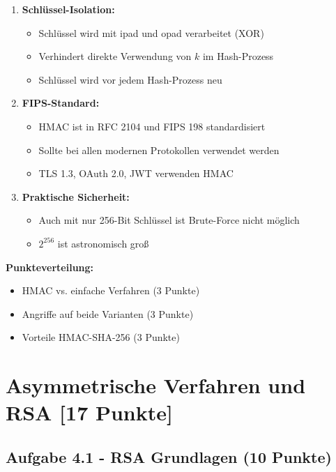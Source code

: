 \documentclass[12pt,a4paper]{article}
\begin{document}
\begin{tcolorbox}[colback=solutionbg, colframe=black!30]
\begin{enumerate}[1.]
    \item \textbf{Schlüssel-Isolation:}
    \begin{itemize}
        \item Schlüssel wird mit ipad und opad verarbeitet (XOR)
        \item Verhindert direkte Verwendung von $k$ im Hash-Prozess
        \item Schlüssel wird vor jedem Hash-Prozess neu
    \end{itemize}
    
    \item \textbf{FIPS-Standard:}
    \begin{itemize}
        \item HMAC ist in RFC 2104 und FIPS 198 standardisiert
        \item Sollte bei allen modernen Protokollen verwendet werden
        \item TLS 1.3, OAuth 2.0, JWT verwenden HMAC
    \end{itemize}
    
    \item \textbf{Praktische Sicherheit:}
    \begin{itemize}
        \item Auch mit nur 256-Bit Schlüssel ist Brute-Force nicht möglich
        \item $2^{256}$ ist astronomisch groß
    \end{itemize}
\end{enumerate}

\end{tcolorbox}

\textbf{Punkteverteilung:}
\begin{itemize}
    \item HMAC vs. einfache Verfahren (3 Punkte) \checkmark
    \item Angriffe auf beide Varianten (3 Punkte) \checkmark
    \item Vorteile HMAC-SHA-256 (3 Punkte) \checkmark
\end{itemize}


\newpage

\section{Asymmetrische Verfahren und RSA [17 Punkte]}

\subsection{Aufgabe 4.1 - RSA Grundlagen (10 Punkte)}
\end{document}
